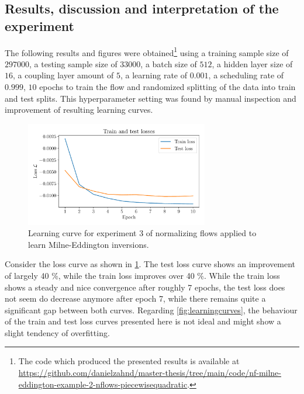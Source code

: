 \documentclass[a4paper,12pt]{report}
\begin{document}
\subsection{Results, discussion and interpretation of the experiment}
The following results and figures were obtained\footnote{The code which produced the presented results is available at \url{https://github.com/danielzahnd/master-thesis/tree/main/code/nf-milne-eddington-example-2-nflows-piecewisequadratic}.} using a training sample size of $297000$, a testing sample size of $33000$, a batch size of $512$, a hidden layer size of $16$, a coupling layer amount of $5$, a learning rate of $0.001$, a scheduling rate of $0.999$, $10$ epochs to train the flow and randomized splitting of the data into train and test splits. This hyperparameter setting was found by manual inspection and improvement of resulting learning curves.

\begin{figure}[h]
\centering
\includegraphics[width=8cm]{figures/nf-milne-eddington-example-2-loss-nflows-piecewisequadratic.pdf}
\caption{Learning curve for experiment 3 of normalizing flows applied to learn Milne-Eddington inversions.}
\label{fig:nf-milne-eddington-example-2-loss-nflows-piecewisequadratic}
\end{figure}

Consider the loss curve as shown in \cref{fig:nf-milne-eddington-example-2-loss-nflows-piecewisequadratic}. The test loss curve shows an improvement of largely 40 \%, while the train loss improves over 40 \%. While the train loss shows a steady and nice convergence after roughly 7 epochs, the test loss does not seem do decrease anymore after epoch 7, while there remains quite a significant gap between both curves. Regarding \cref{fig:learningcurves}, the behaviour of the train and test loss curves presented here is not ideal and might show a slight tendency of overfitting.
\end{document}
